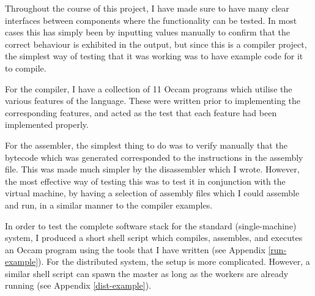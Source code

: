 Throughout the course of this project, I have made sure to have many clear
interfaces between components where the functionality can be tested. In most
cases this has simply been by inputting values manually to confirm that the
correct behaviour is exhibited in the output, but since this is a compiler
project, the simplest way of testing that it was working was to have example
code for it to compile.

For the compiler, I have a collection of 11 Occam programs which utilise the
various features of the language. These were written prior to implementing the
corresponding features, and acted as the test that each feature had been
implemented properly.

For the assembler, the simplest thing to do was to verify manually that the
bytecode which was generated corresponded to the instructions in the assembly
file. This was made much simpler by the disassembler which I wrote. However, the
most effective way of testing this was to test it in conjunction with the
virtual machine, by having a selection of assembly files which I could assemble
and run, in a similar manner to the compiler examples.

In order to test the complete software stack for the standard (single-machine)
system, I produced a short shell script which compiles, assembles, and executes
an Occam program using the tools that I have written (see Appendix
\ref{run-example}).  For the distributed system, the setup is more complicated.
However, a similar
shell script can spawn the master as long as the workers are already running
(see Appendix \ref{dist-example}).

